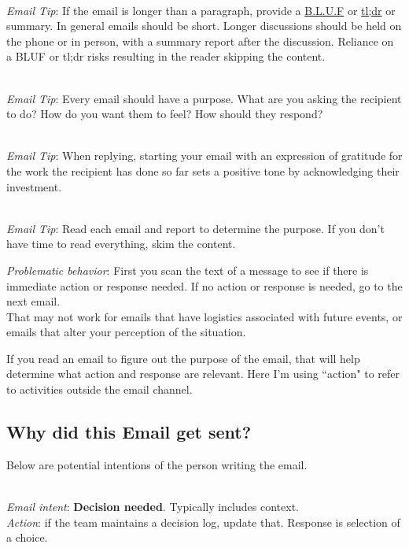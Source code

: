 \ \\
\textit{Email Tip}: If the email is longer than a paragraph, provide a \href{https://en.wikipedia.org/wiki/BLUF_(communication)}{B.L.U.F} or \href{https://en.wikipedia.org/wiki/Wikipedia:Too_long;_didn\%27t_read}{tl;dr} or summary. In general emails should be short. Longer discussions should be held on the phone or in person, with a summary report after the discussion. Reliance on a BLUF or tl;dr risks resulting in the reader skipping the content. 

\ \\
\textit{Email Tip}: Every email should have a purpose. What are you asking the recipient to do? How do you want them to feel? How should they respond?

\ \\
\textit{Email Tip}: When replying, starting your email with an expression of gratitude for the work the recipient has done so far sets a positive tone by acknowledging their investment.

\ \\
\textit{Email Tip}: Read each email and report to determine the purpose. If you don't have time to read everything, skim the content. 

\textit{Problematic behavior}: First you scan the text of a message to see if there is immediate action or response needed. If no action or response is needed, go to the next email. \\
That may not work for emails that have logistics associated with future events, or emails that alter your perception of the situation.


If you read an email to figure out the purpose of the email, that will help determine what action and response are relevant. Here I'm using ``action" to refer to activities outside the email channel. 


\subsection*{Why did this Email get sent?}
Below are potential intentions of the person writing the email. 

\ \\
\textit{Email intent}: \textbf{Decision needed}. Typically includes context. \\
\textit{Action}: if the team maintains a decision log, update that.
Response is selection of a choice.

